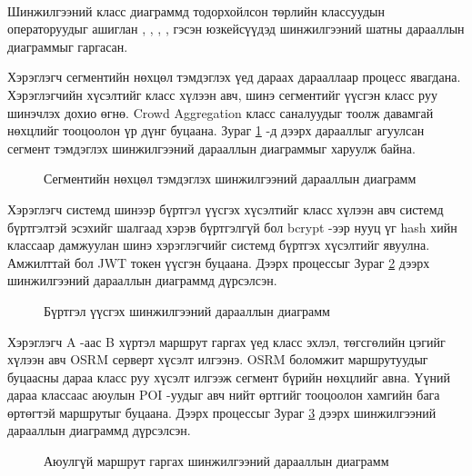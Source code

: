 \paragraph{}
Шинжилгээний класс диаграммд тодорхойлсон  төрлийн классуудын операторуудыг ашиглан , , , ,  гэсэн юзкейсүүдэд шинжилгээний шатны дарааллын диаграммыг гаргасан.
\par \noindent
Хэрэглэгч сегментийн нөхцөл тэмдэглэх үед дараах дарааллаар процесс явагдана. Хэрэглэгчийн хүсэлтийг  класс хүлээн авч, шинэ сегментийг үүсгэн  класс руу шинэчлэх дохио өгнө. Crowd Aggregation класс саналуудыг тоолж давамгай нөхцлийг тооцоолон үр дүнг буцаана. Зураг \ref{fig:segment-zh} -д дээрх дарааллыг агуулсан сегмент тэмдэглэх шинжилгээний дарааллын диаграммыг харуулж байна.
\begin{figure}[H]
    \centering
    \caption{Сегментийн нөхцөл тэмдэглэх шинжилгээний дарааллын диаграмм}
    \label{fig:segment-zh}
\end{figure}
\par \noindent
Хэрэглэгч системд шинээр бүртгэл үүсгэх хүсэлтийг  класс хүлээн авч системд бүртгэлтэй эсэхийг шалгаад хэрэв бүртгэлгүй бол bcrypt -ээр нууц үг hash хийн  классаар дамжуулан шинэ хэрэглэгчийг системд бүртгэх хүсэлтийг явуулна. Амжилттай бол JWT токен үүсгэн буцаана. Дээрх процессыг Зураг \ref{fig:burtguuleh-zh} дээрх шинжилгээний дарааллын диаграммд дүрсэлсэн.
\begin{figure}[H]
    \centering
    \caption{Бүртгэл үүсгэх шинжилгээний дарааллын диаграмм}
    \label{fig:burtguuleh-zh}
\end{figure}
\par \noindent
Хэрэглэгч A -аас B хүртэл маршрут гаргах үед  класс эхлэл, төгсгөлийн цэгийг хүлээн авч OSRM серверт хүсэлт илгээнэ. OSRM боломжит маршрутуудыг буцаасны дараа  класс руу хүсэлт илгээж сегмент бүрийн нөхцлийг авна. Үүний дараа  классаас аюулын POI -уудыг авч нийт өртгийг тооцоолон хамгийн бага өртөгтэй маршрутыг буцаана. Дээрх процессыг Зураг \ref{fig:route-zh} дээрх шинжилгээний дарааллын диаграммд дүрсэлсэн.
\begin{figure}[H]
    \centering
    \caption{Аюулгүй маршрут гаргах шинжилгээний дарааллын диаграмм}
    \label{fig:route-zh}
\end{figure}
\par \noindent

